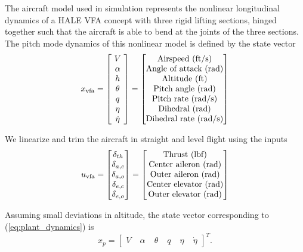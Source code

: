 The aircraft model used in simulation represents the nonlinear longitudinal dynamics of a HALE VFA concept with three rigid lifting sections, hinged together such that the aircraft is able to bend at the joints of the three sections. The pitch mode dynamics of this nonlinear model is defined by the state vector
\begin{equation}
x_{\text{vfa}} = \begin{bmatrix}
~V~\\
\alpha \\
h \\
\theta \\
q\\
\eta\\
\dot{\eta}
\end{bmatrix} =
\begin{bmatrix}
	 $Airspeed (ft/s)$\\ $Angle of attack (rad)$\\ $Altitude (ft)$\\ $Pitch angle (rad)$\\ $Pitch rate (rad/s)$\\ $Dihedral (rad)$\\ $Dihedral rate (rad/s)$
\end{bmatrix}
\end{equation}

We linearize and trim the aircraft in straight and level flight using the inputs
\begin{equation}
	u_{\text{vfa}} = \begin{bmatrix}
\delta_{th} \\
\delta_{a,c} \\
\delta_{a,o} \\
\delta_{e,c} \\
\delta_{e,o} 
\end{bmatrix} = \begin{bmatrix}
		$Thrust (lbf)$\\
		$Center aileron (rad)$\\
		$Outer aileron (rad)$\\
		$Center elevator (rad)$\\
		$Outer elevator (rad)$
	\end{bmatrix}
\end{equation}

Assuming small deviations in altitude, the state vector corresponding to (\ref{eq:plant_dynamics}) is
\begin{equation}
	x_p = \begin{bmatrix}
V & \; \alpha & \; \theta & \; q & \; \eta & \; \dot{\eta}
\end{bmatrix}^T.
\end{equation}

